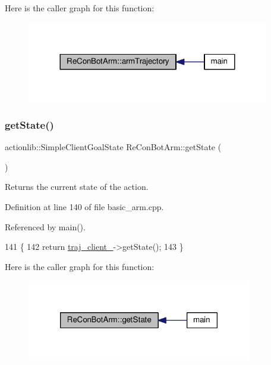 Here is the caller graph for this function\+:\nopagebreak
\begin{figure}[H]
\begin{center}
\leavevmode
\includegraphics[width=300pt]{d3/d06/class_re_con_bot_arm_ac499ee22d73b90c860f06a16afcd2fb0_icgraph}
\end{center}
\end{figure}
\mbox{\label{class_re_con_bot_arm_a179480efa62ff256fb8b3ddc0685d762}} 
\subsubsection{\texorpdfstring{get\+State()}{getState()}}
{\footnotesize\ttfamily actionlib\+::\+Simple\+Client\+Goal\+State Re\+Con\+Bot\+Arm\+::get\+State (\begin{DoxyParamCaption}{ }\end{DoxyParamCaption})\hspace{0.3cm}{\ttfamily [inline]}}



Returns the current state of the action. 



Definition at line 140 of file basic\+\_\+arm.\+cpp.



Referenced by main().


\begin{DoxyCode}
141     \{
142       \textcolor{keywordflow}{return} \hyperlink{class_re_con_bot_arm_a0be83821f776c5ca9874fabbeaa177cf}{traj\_client\_}->getState();
143     \}
\end{DoxyCode}
Here is the caller graph for this function\+:\nopagebreak
\begin{figure}[H]
\begin{center}
\leavevmode
\includegraphics[width=278pt]{d3/d06/class_re_con_bot_arm_a179480efa62ff256fb8b3ddc0685d762_icgraph}
\end{center}
\end{figure}
\mbox{\label{class_re_con_bot_arm_a52f6f89615b17a421d5cd8b51b2962d7}} 
